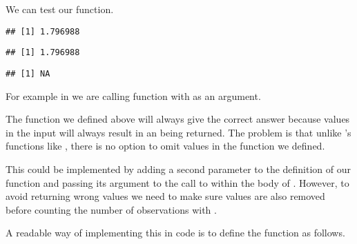 \documentclass[krantz2]{krantz}\usepackage{knitr}
\begin{document}
We can test our function.

\begin{knitrout}\footnotesize
{}\color{fgcolor}\begin{kframe}
\begin{alltt}
 \hlkwb{<-} \hlstd{(}\hlstd{,} \hlstd{,} \hlstd{,} \hlopt{-}\hlstd{)}
 \hlkwb{<-}  \hlstd{)}
\hlstd{(} 
\end{alltt}
\begin{verbatim}
## [1] 1.796988
\end{verbatim}
\begin{alltt}
\end{alltt}
\begin{verbatim}
## [1] 1.796988
\end{verbatim}
\begin{alltt}
\end{alltt}
\begin{verbatim}
## [1] NA
\end{verbatim}
\end{kframe}
\end{knitrout}

For example in  we are calling function  with  as an argument.

The function we defined above will always give the correct answer because  values in the input will always result in an  being returned. The problem is that unlike \Rlang's functions like , there is no option to omit  values in the function we defined.

This could be implemented by adding a second parameter  to the definition of our function and passing its argument to the call to  within the body of . However, to avoid returning wrong values we need to make sure  values are also removed before counting the number of observations with .

A readable way of implementing this in code is to define the function as follows.

\begin{knitrout}\footnotesize
{}\color{fgcolor}\begin{kframe}
\begin{alltt}
 \hlkwb{<-} \hlstd{(}\hlstd{,}  \hlstd{=} \hlstd{) \{}
  
    \hlkwb{<-} 
 \hlstd{\}}
 \hlstd{(}\hlopt{/}
\hlstd{\}}
\end{alltt}
\end{kframe}
\end{knitrout}
\end{document}

